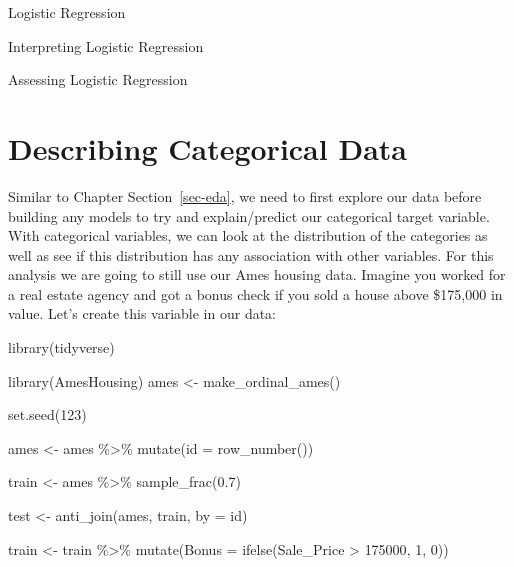 \documentclass[
  letterpaper,
  DIV=11,
  numbers=noendperiod]{scrreprt}
\newenvironment{Shaded}{\begin{snugshade}}{\end{snugshade}}
\newcommand{\AttributeTok}[1]{\textcolor[rgb]{0.40,0.45,0.13}{#1}}
\newcommand{\DecValTok}[1]{\textcolor[rgb]{0.68,0.00,0.00}{#1}}
\newcommand{\FloatTok}[1]{\textcolor[rgb]{0.68,0.00,0.00}{#1}}
\newcommand{\FunctionTok}[1]{\textcolor[rgb]{0.28,0.35,0.67}{#1}}
\newcommand{\NormalTok}[1]{\textcolor[rgb]{0.00,0.23,0.31}{#1}}
\newcommand{\OtherTok}[1]{\textcolor[rgb]{0.00,0.23,0.31}{#1}}
\newcommand{\SpecialCharTok}[1]{\textcolor[rgb]{0.37,0.37,0.37}{#1}}
\newcommand{\StringTok}[1]{\textcolor[rgb]{0.13,0.47,0.30}{#1}}
\begin{document}
Logistic Regression

Interpreting Logistic Regression

Assessing Logistic Regression

\hypertarget{describing-categorical-data}{%
\section{Describing Categorical
Data}\label{describing-categorical-data}}

Similar to Chapter Section~\ref{sec-eda}, we need to first explore our
data before building any models to try and explain/predict our
categorical target variable. With categorical variables, we can look at
the distribution of the categories as well as see if this distribution
has any association with other variables. For this analysis we are going
to still use our Ames housing data. Imagine you worked for a real estate
agency and got a bonus check if you sold a house above \$175,000 in
value. Let's create this variable in our data:

\begin{Shaded}
\begin{Highlighting}[]
\FunctionTok{library}\NormalTok{(tidyverse)}

\FunctionTok{library}\NormalTok{(AmesHousing)}
\NormalTok{ames }\OtherTok{\textless{}{-}} \FunctionTok{make\_ordinal\_ames}\NormalTok{()}

\FunctionTok{set.seed}\NormalTok{(}\DecValTok{123}\NormalTok{)}

\NormalTok{ames }\OtherTok{\textless{}{-}}\NormalTok{ ames }\SpecialCharTok{\%\textgreater{}\%} \FunctionTok{mutate}\NormalTok{(}\AttributeTok{id =} \FunctionTok{row\_number}\NormalTok{())}

\NormalTok{train }\OtherTok{\textless{}{-}}\NormalTok{ ames }\SpecialCharTok{\%\textgreater{}\%} \FunctionTok{sample\_frac}\NormalTok{(}\FloatTok{0.7}\NormalTok{)}

\NormalTok{test }\OtherTok{\textless{}{-}} \FunctionTok{anti\_join}\NormalTok{(ames, train, }\AttributeTok{by =} \StringTok{\textquotesingle{}id\textquotesingle{}}\NormalTok{)}
\end{Highlighting}
\end{Shaded}

\begin{Shaded}
\begin{Highlighting}[]
\NormalTok{train }\OtherTok{\textless{}{-}}\NormalTok{ train }\SpecialCharTok{\%\textgreater{}\%}
  \FunctionTok{mutate}\NormalTok{(}\AttributeTok{Bonus =} \FunctionTok{ifelse}\NormalTok{(Sale\_Price }\SpecialCharTok{\textgreater{}} \DecValTok{175000}\NormalTok{, }\DecValTok{1}\NormalTok{, }\DecValTok{0}\NormalTok{))}
\end{Highlighting}
\end{Shaded}
\end{document}
